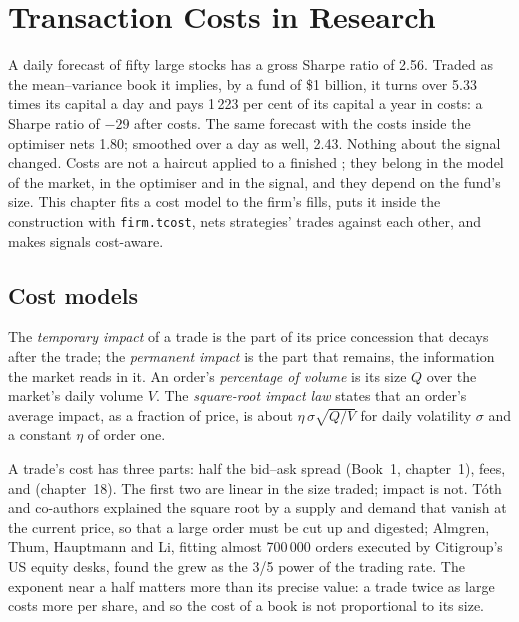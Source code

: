 \chapter{Transaction Costs in Research}\label{ch:rs:transaction-costs-in-research}

A daily forecast of fifty large stocks has a gross Sharpe ratio of 2.56. Traded as the mean--variance book it implies, by a fund of \$1 billion, it turns over
5.33 times its capital a day and pays 1\,223 per cent of its capital a year in costs: a Sharpe ratio of $-29$ after costs. The same forecast with the costs inside
the optimiser nets 1.80; smoothed over a day as well, 2.43. Nothing about the signal changed. Costs are not a haircut applied to a finished ; they belong
in the model of the market, in the optimiser and in the signal, and they depend on the fund's size. This chapter fits a cost model to the firm's fills, puts it
inside the construction with \texttt{firm.tcost}, nets strategies' trades against each other, and makes signals cost-aware.

\section{Cost models}

\begin{definition}\label{def:rs:transaction-costs-in-research:impact}
The \emph{temporary impact} of a trade is the part of its price concession that decays after the trade; the \emph{permanent
impact} is the part that remains, the information the market reads in it. An order's \emph{percentage of volume}
is its size $Q$ over the market's daily volume $V$. The \emph{square-root impact law} states that an order's average impact, as a fraction
of price, is about $\eta\,\sigma\sqrt{Q/V}$ for daily volatility $\sigma$ and a constant $\eta$ of order one.
\end{definition}

A trade's cost has three parts: half the bid--ask spread (Book~1, chapter~1), fees, and  (chapter~18). The first two are linear in the size traded;
impact is not. Tóth and co-authors explained the square root by a supply and demand that vanish at the current price, so that a large order must be cut up and
digested; Almgren, Thum, Hauptmann and Li, fitting almost 700\,000 orders executed by Citigroup's US equity desks, found the  grew as the 3/5 power of
the trading rate. The exponent near a half matters more than its precise value: a trade twice as large costs more per share, and so the cost of a book is not
proportional to its size.

